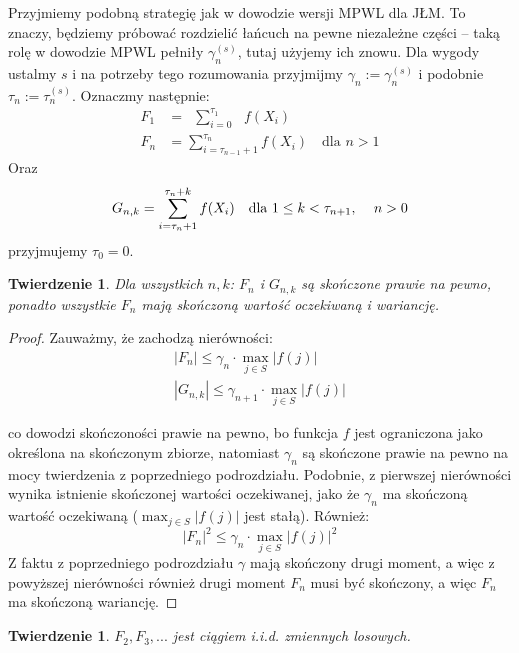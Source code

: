\documentclass[a4paper]{article}
\theoremstyle{defn}
\theoremstyle{theorem}
\newtheorem{theorem}[defn]{Twierdzenie}
\theoremstyle{lemma}
\theoremstyle{cor}
\theoremstyle{fact}
\begin{document}
Przyjmiemy podobną strategię jak w dowodzie wersji MPWL dla JŁM. To znaczy, będziemy próbować rozdzielić łańcuch na pewne niezależne części – taką rolę w dowodzie MPWL pełniły $\gamma_n^{(s)}$, tutaj użyjemy ich znowu. Dla wygody ustalmy $s$ i na potrzeby tego rozumowania przyjmijmy $\gamma_n := \gamma_n^{(s)}$ i podobnie $\tau_n := \tau_n^{(s)}$.
Oznaczmy następnie:
\begin{align*}
    F_1 &= \,\,\,\sum\limits_{i = 0}^{\tau_1} \,\,\,\,f(X_i)\\
    F_n &= \sum\limits_{i = \tau_{n-1}+1}^{\tau_n} f(X_i) \quad \text{dla $n > 1$}
\end{align*}
Oraz
\begin{align*}
    G_{n, k} = \sum\limits_{i = \tau_n+1}^{\tau_n+k} f(X_i) \quad \text{dla $1 \leq k < \tau_{n+1}$, \quad $n > 0$}
\end{align*}
przyjmujemy $\tau_0 = 0$.
\begin{theorem}\label{theorem2.6.2}
Dla wszystkich $n,k$: $F_n$ i $G_{n,k}$ są skończone prawie na pewno, ponadto wszystkie $F_n$ mają skończoną wartość oczekiwaną i wariancję.
\end{theorem}
\begin{proof}
Zauważmy, że zachodzą nierówności:
\begin{align*}
    |F_n| \leq \gamma_n \cdot \max_{j \in S} |f(j)|\\
    |G_{n,k}| \leq \gamma_{n+1} \cdot \max_{j \in S} |f(j)|
\end{align*}

co dowodzi skończoności prawie na pewno, bo funkcja $f$ jest ograniczona jako określona na skończonym zbiorze, natomiast $\gamma_n$ są skończone prawie na pewno na mocy twierdzenia z poprzedniego podrozdziału. Podobnie, z pierwszej nierówności wynika istnienie skończonej wartości oczekiwanej, jako że $\gamma_n$ ma skończoną wartość oczekiwaną ($\max_{j \in S} |f(j)|$ jest stałą). Również:
$$|F_n|^2 \leq \gamma_n \cdot \max_{j \in S} |f(j)|^2$$
Z faktu z poprzedniego podrozdziału $\gamma$ mają skończony drugi moment, a więc z powyższej nierówności również drugi moment $F_n$ musi być skończony, a więc $F_n$ ma skończoną wariancję.
\end{proof}
\begin{theorem}\label{theorem2.6.3}
$F_2, F_3,...$ jest ciągiem i.i.d. zmiennych losowych.
\end{theorem}
\end{document}
